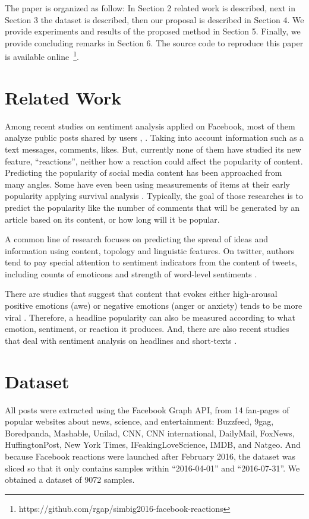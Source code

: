 \documentclass[11pt]{article}
\begin{document}
The paper is organized as follow: In Section 2 related work is described, next in Section 3 the dataset is described, then our proposal is described in Section 4. We provide experiments and results of the proposed method in Section 5. Finally, we provide concluding remarks in Section 6. The source code to reproduce this paper is available online~\footnote{https://github.com/rgap/simbig2016-facebook-reactions}.


\section{Related Work}

Among recent studies on sentiment analysis applied on Facebook, most of them analyze public posts shared by users \cite{rastogi2014sentiment}, \cite{gao2015more}. Taking into account information such as a text messages, comments, likes. But, currently none of them have studied its new feature, ``reactions'', neither how a reaction could affect the popularity of content. Predicting the popularity of social media content has been approached from many angles. Some have even been using measurements of items at their early popularity applying survival analysis \cite{lee2010approach}. Typically, the goal of those researches is to predict the popularity like the number of comments that will be generated by an article based on its content, or how long will it be popular.

A common line of research focuses on predicting the spread of ideas and information using content, topology and linguistic features. On twitter, authors tend to pay special attention to sentiment indicators from the content of tweets, including counts of emoticons and strength of word-level sentiments \cite{kong2014predicting}.

There are studies that suggest that content that evokes either high-arousal positive emotions (awe) or negative emotions (anger or anxiety) tends to be more viral \cite{berger2013emotion}. Therefore, a headline popularity can also be measured according to what emotion, sentiment, or reaction it produces. And, there are also recent studies that deal with sentiment analysis on headlines and short-texts \cite{nassirtoussi2015text}. 


\section{Dataset}

All posts were extracted using the Facebook Graph API, from 14 fan-pages of popular websites about news, science, and entertainment: Buzzfeed, 9gag, Boredpanda, Mashable, Unilad, CNN, CNN international, DailyMail, FoxNews, HuffingtonPost, New York Times, IFeakingLoveScience, IMDB, and Natgeo. And because Facebook reactions were launched after February 2016, the dataset was sliced so that it only contains samples within ``2016-04-01'' and ``2016-07-31''. We obtained a dataset of 9072 samples.
\end{document}
